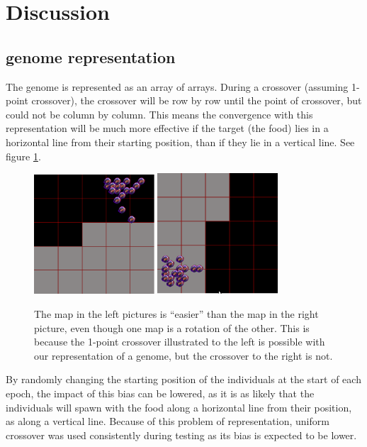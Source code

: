 \documentclass[a4paper,12pt]{article}
\begin{document}
\section{Discussion}
\subsection{genome representation}
The genome is represented as an array of arrays. During a crossover (assuming 1-point crossover), the crossover will be row by row until the point of crossover, but could not be column by column. This means the convergence with this representation will be much more effective if the target (the food) lies in a horizontal line from their starting position, than if they lie in a vertical line. See figure \ref{fig:bias}.

\begin{figure}[h!]
\includegraphics[width=0.4\textwidth]{TopRight.png}
\includegraphics[width=0.4\textwidth]{BottomLeft.png}
\caption{The map in the left pictures is ``easier'' than the map in the right picture, even though one map is a rotation of the other. This is because the 1-point crossover illustrated to the left is possible with our representation of a genome, but the crossover to the right is not.}
\label{fig:bias}
\end{figure}

By randomly changing the starting position of the individuals at the start of each epoch, the impact of this bias can be lowered, as it is as likely that the individuals will spawn with the food along a horizontal line from their position, as along a vertical line. Because of this problem of representation, uniform crossover was used consistently during testing as its bias is expected to be lower.
\end{document}

